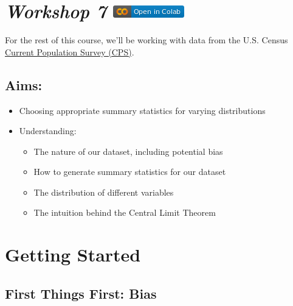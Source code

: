 \documentclass[
  letterpaper,
  DIV=11,
  numbers=noendperiod]{scrreprt}
\providecommand{\tightlist}{%
  \setlength{\itemsep}{0pt}\setlength{\parskip}{0pt}}\usepackage{longtable,booktabs,array}
\begin{document}
\hypertarget{workshop-7-open-in-colab}{%
\section[\emph{Workshop 7} ]{\texorpdfstring{\emph{Workshop 7}
\href{https://colab.research.google.com/github/oballinger/QM2/blob/main/notebooks/W07.\%20Distributions\%20and\%20Basic\%20Statistics.ipynb}{\protect\includegraphics{index_files/mediabag/colab-badge.png}}}{Workshop 7 Open In Colab}}\label{workshop-7-open-in-colab}}

For the rest of this course, we'll be working with data from the U.S.
Census \href{https://www.census.gov/programs-surveys/cps.html}{Current
Population Survey (CPS)}.

\hypertarget{aims-3}{%
\subsection{Aims:}\label{aims-3}}

\begin{itemize}
\item
  Choosing appropriate summary statistics for varying distributions
\item
  Understanding:

  \begin{itemize}
  \tightlist
  \item
    The nature of our dataset, including potential bias
  \item
    How to generate summary statistics for our dataset
  \item
    The distribution of different variables
  \item
    The intuition behind the Central Limit Theorem
  \end{itemize}
\end{itemize}

\hypertarget{getting-started-1}{%
\section{Getting Started}\label{getting-started-1}}

\hypertarget{first-things-first-bias}{%
\subsection{First Things First: Bias}\label{first-things-first-bias}}
\end{document}
